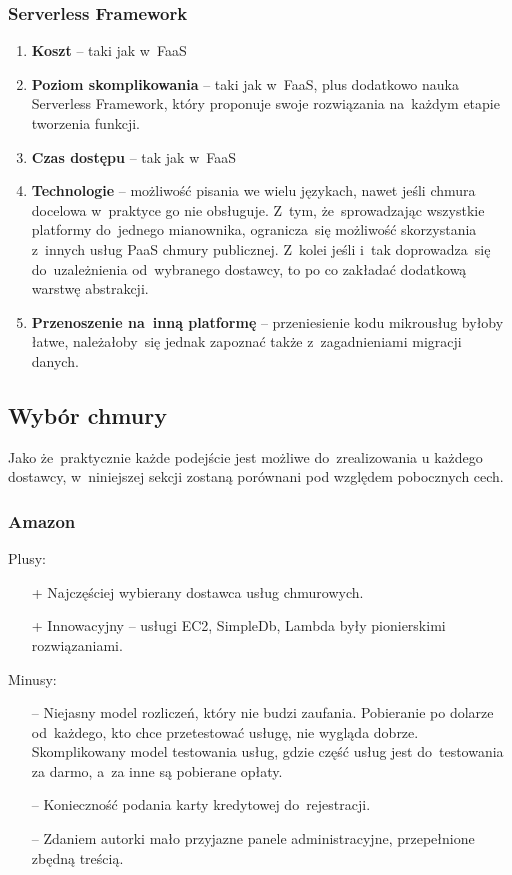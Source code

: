 \documentclass[12pt,a4paper,twoside,titlepage,openright]{book}
\begin{document}
\subsubsection{Serverless Framework}

\begin{enumerate}
	\item \textbf{Koszt} -- taki jak w~FaaS
	\item \textbf{Poziom skomplikowania} -- taki jak w~FaaS, plus dodatkowo nauka Serverless Framework, który proponuje swoje rozwiązania na~każdym etapie tworzenia funkcji. 
	\item \textbf{Czas dostępu} -- tak jak w~FaaS
	\item \textbf{Technologie} -- możliwość pisania we wielu językach, nawet jeśli chmura docelowa w~praktyce go nie obsługuje. Z~tym, że~sprowadzając wszystkie platformy do~jednego mianownika, ogranicza~się możliwość skorzystania z~innych usług PaaS chmury publicznej. Z~kolei jeśli i~tak doprowadza~się do~uzależnienia od~wybranego dostawcy, to po co zakładać dodatkową warstwę abstrakcji.
	\item \textbf{Przenoszenie na~inną platformę} -- przeniesienie kodu mikrousług byłoby łatwe, należałoby~się jednak zapoznać także z~zagadnieniami migracji danych.
\end{enumerate}
	
\subsection{Wybór chmury}

Jako że~praktycznie każde podejście jest możliwe do~zrealizowania u każdego dostawcy, w~niniejszej sekcji zostaną porównani pod względem pobocznych cech.

\subsubsection{Amazon}

Plusy:
\begin{itemize}
\item[+] Najczęściej wybierany dostawca usług chmurowych.
\item[+] Innowacyjny -- usługi EC2, SimpleDb, Lambda były pionierskimi rozwiązaniami.
\end{itemize}

\noindent
Minusy:
\begin{itemize}
\item[--] Niejasny model rozliczeń, który nie budzi zaufania. Pobieranie po dolarze od~każdego, kto chce przetestować usługę, nie wygląda dobrze. Skomplikowany model testowania usług, gdzie część usług jest do~testowania za darmo, a~za inne są pobierane opłaty. 
\item[--] Konieczność podania karty kredytowej do~rejestracji.
\item[--] Zdaniem autorki mało przyjazne panele administracyjne, przepełnione zbędną treścią.
\end{itemize}
\end{document}

